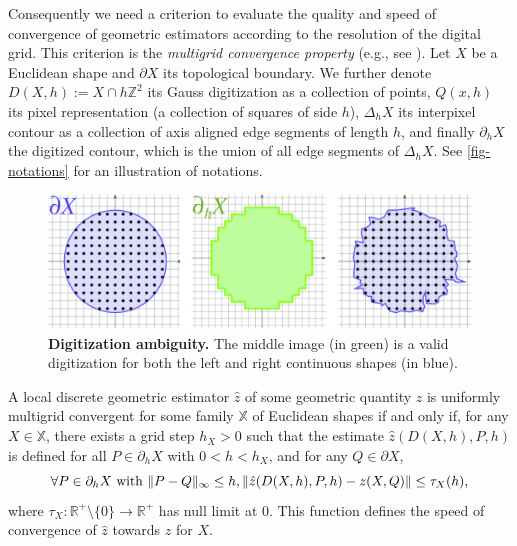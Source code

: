 \documentclass[review]{siamart220329}
\DeclarePairedDelimiter\norm{\lVert}{\rVert}%
\begin{document}
Consequently we need a criterion to evaluate the quality and speed of
convergence of geometric estimators according to the resolution of the digital
grid. This criterion is the \emph{multigrid convergence property} (e.g., see
\cite{klette2004digital}). Let $X$ be a Euclidean shape and $\partial X$ its
topological boundary. We further denote $D(X,h):=X \cap h\mathbb{Z}^2$ its Gauss
digitization as a collection  of points, $Q(x,h)$ its pixel representation (a
collection  of squares of side $h$), $\Delta_h X$ its interpixel contour as a
collection  of axis aligned edge segments of length $h$, and finally
$\partial_hX$ the digitized contour, which is the union of all edge segments of
$\Delta_h X$. See \cref{fig-notations} for an illustration of notations.
%
%
\begin{figure}
\center
\includegraphics[scale=1]{figures/ambiguity-and-boundaries.png}
\caption{
    \textbf{Digitization ambiguity.} The middle image (in green) is a valid
    digitization for both the left and right continuous shapes (in blue).}
\label{fig:digitization-ambiguity}
\end{figure}
%
%
\begin{definition}
A local discrete geometric estimator $\hat{z}$ of some geometric quantity $z$
is uniformly multigrid convergent for some family $\mathbb{X}$ of Euclidean
shapes if and only if, for any $X \in \mathbb{X}$, there exists a grid step
$h_X>0$ such that the estimate $\hat{z}(D(X,h), P,h)$ is defined for all $P
\in \partial_hX$ with $ 0 < h < h_X$, and for any $Q \in \partial X$,
%
%
\begin{equation*}
  \forall P \in  \partial_hX \text{ with } \norm{ P - Q }_{\infty} \leq h,
  \norm{ \hat{z}(D(X,h),P,h) - z(X,Q)} \leq \tau_{X}(h),			
\end{equation*}
%
%
where $\tau_{X}:\mathbb{R}^{+}\setminus\{0\} \rightarrow
\mathbb{R}^{+}$ has null limit at $0$. This function defines the
speed of convergence of $\hat{z}$ towards $z$ for $X$.
\end{definition}
	
\end{document}
